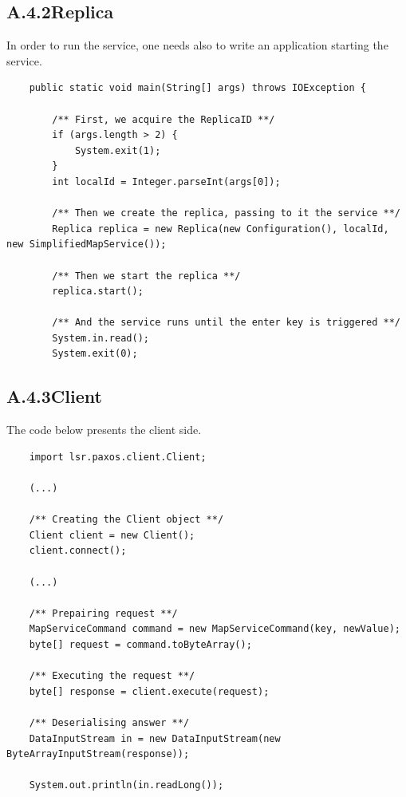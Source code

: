\subsection*{A.4.2\quad Replica}
\label{example:replica}
In order to run the service, one needs also to write an application starting the service.

\begin{lstlisting}
    public static void main(String[] args) throws IOException {

        /** First, we acquire the ReplicaID **/
        if (args.length > 2) {
            System.exit(1);
        }
        int localId = Integer.parseInt(args[0]);

        /** Then we create the replica, passing to it the service **/
        Replica replica = new Replica(new Configuration(), localId, new SimplifiedMapService());

        /** Then we start the replica **/
        replica.start();

        /** And the service runs until the enter key is triggered **/
        System.in.read();
        System.exit(0);
\end{lstlisting}


\subsection*{A.4.3\quad Client}
\label{example:client}
The code below presents the client side.

\begin{lstlisting}
    import lsr.paxos.client.Client;
    
    (...)
    
    /** Creating the Client object **/
    Client client = new Client();
    client.connect();
    
    (...)
    
    /** Prepairing request **/
    MapServiceCommand command = new MapServiceCommand(key, newValue);
    byte[] request = command.toByteArray();
    
    /** Executing the request **/
    byte[] response = client.execute(request);
    
    /** Deserialising answer **/
    DataInputStream in = new DataInputStream(new ByteArrayInputStream(response));
    
    System.out.println(in.readLong());
\end{lstlisting}


